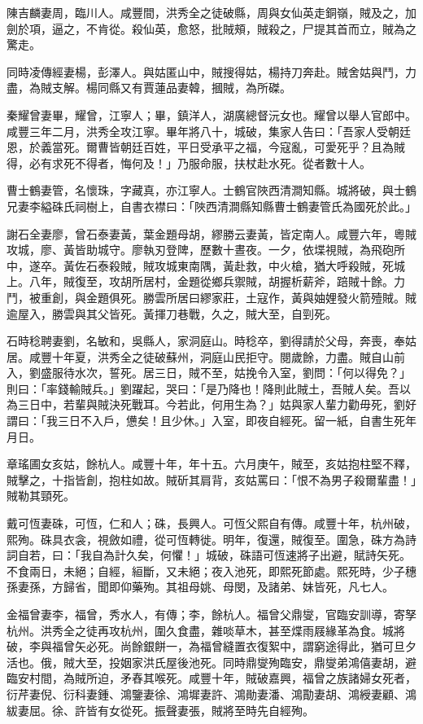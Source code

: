 \begin{pinyinscope}
陳吉麟妻周，臨川人。咸豐間，洪秀全之徒破縣，周與女仙英走銅嶺，賊及之，加劍於項，逼之，不肯從。殺仙英，愈怒，批賊頰，賊殺之，尸提其首而立，賊為之驚走。

同時凌傳經妻楊，彭澤人。與姑匿山中，賊搜得姑，楊持刀奔赴。賊舍姑與鬥，力盡，為賊支解。楊同縣又有賈蓮品妻韓，摑賊，為所磔。

秦耀曾妻畢，耀曾，江寧人；畢，鎮洋人，湖廣總督沅女也。耀曾以舉人官郎中。咸豐三年二月，洪秀全攻江寧。畢年將八十，城破，集家人告曰：「吾家人受朝廷恩，於義當死。爾曹皆朝廷百姓，平日受承平之福，今寇亂，可愛死乎？且為賊得，必有求死不得者，悔何及！」乃服命服，扶杖赴水死。從者數十人。

曹士鶴妻管，名懷珠，字藏真，亦江寧人。士鶴官陜西清澗知縣。城將破，與士鶴兄妻李縊硃氏祠樹上，自書衣襟曰：「陜西清澗縣知縣曹士鶴妻管氏為國死於此。」

謝石全妻廖，曾石泰妻黃，葉金題母胡，繆勝云妻黃，皆定南人。咸豐六年，粵賊攻城，廖、黃皆助城守。廖執刃登陴，歷數十晝夜。一夕，依堞視賊，為飛砲所中，遂卒。黃佐石泰殺賊，賊攻城東南隅，黃赴救，中火槍，猶大呼殺賊，死城上。八年，賊復至，攻胡所居村，金題從鄉兵禦賊，胡握析薪斧，踣賊十餘。力鬥，被重創，與金題俱死。勝雲所居曰繆家莊，土寇作，黃與妯娌發火箭殪賊。賊逾屋入，勝雲與其父皆死。黃揮刀巷戰，久之，賊大至，自剄死。

石時稔聘妻劉，名敏和，吳縣人，家洞庭山。時稔卒，劉得請於父母，奔喪，奉姑居。咸豐十年夏，洪秀全之徒破蘇州，洞庭山民拒守。閱歲餘，力盡。賊自山前入，劉盛服待水次，誓死。居三日，賊不至，姑挽令入室，劉問：「何以得免？」則曰：「率錢輸賊兵。」劉躍起，哭曰：「是乃降也！降則此賊土，吾賊人矣。吾以為三日中，若輩與賊決死戰耳。今若此，何用生為？」姑與家人輩力勸毋死，劉好謂曰：「我三日不入戶，憊矣！且少休。」入室，即夜自經死。留一紙，自書生死年月日。

章瑤圃女亥姑，餘杭人。咸豐十年，年十五。六月庚午，賊至，亥姑抱柱堅不釋，賊擊之，十指皆創，抱柱如故。賊斫其肩背，亥姑罵曰：「恨不為男子殺爾輩盡！」賊勒其頸死。

戴可恆妻硃，可恆，仁和人；硃，長興人。可恆父熙自有傳。咸豐十年，杭州破，熙殉。硃具衣衾，視斂如禮，從可恆轉徙。明年，復還，賊復至。圍急，硃方為詩詞自若，曰：「我自為計久矣，何懼！」城破，硃語可恆速將子出避，賦詩矢死。不食兩日，未絕；自經，絙斷，又未絕；夜入池死，即熙死節處。熙死時，少子穗孫妻孫，方歸省，聞即仰藥殉。其祖母姚、母閔，及諸弟、妹皆死，凡七人。

金福曾妻李，福曾，秀水人，有傳；李，餘杭人。福曾父鼎燮，官臨安訓導，寄孥杭州。洪秀全之徒再攻杭州，圍久食盡，雜啖草木，甚至煠雨屐緣革為食。城將破，李與福曾矢必死。尚餘銀餅一，為福曾縫置衣復絮中，謂窮途得此，猶可旦夕活也。俄，賊大至，投姻家洪氏屋後池死。同時鼎燮殉臨安，鼎燮弟鴻僖妻胡，避臨安村間，為賊所迫，矛舂其喉死。咸豐十年，賊破嘉興，福曾之族諸婦女死者，衍芹妻倪、衍科妻鍾、鴻鑒妻徐、鴻墀妻許、鴻勛妻潘、鴻勩妻胡、鴻綬妻顧、鴻紱妻屈。徐、許皆有女從死。振聲妻張，賊將至時先自經殉。


\end{pinyinscope}
